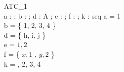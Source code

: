 \begin{schema}{ATC\_1}\\
 a : \nat ;
 b : \power \nat ;
 d : \power A ;
 e : \nat \cross \nat;
 f : \power \A \cross \nat ;
 k : seq \nat
\where
 a = 1 \\
 b = \{ 1, 2, 3, 4 \} \\
 d = \{ h, i, j \} \\
 e = \(1, 2\) \\
 f = \{ \(x,1\) , \(y,2\) \} \\
 k = , 2, 3, 4 \rangle
\end{schema}